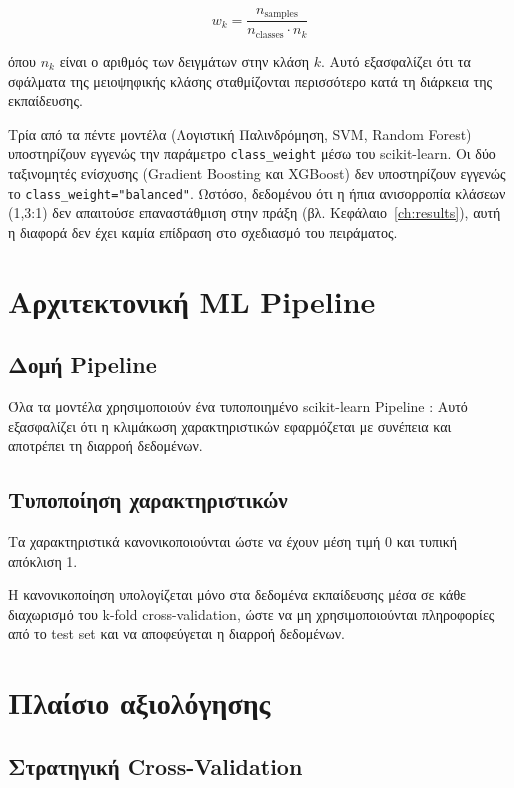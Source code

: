 \begin{equation}
w_k = \frac{n_{\text{samples}}}{n_{\text{classes}} \cdot n_k}
\label{eq:class-weight}
\end{equation}

όπου $n_k$ είναι ο αριθμός των δειγμάτων στην κλάση $k$. Αυτό εξασφαλίζει ότι τα σφάλματα της μειοψηφικής κλάσης σταθμίζονται περισσότερο κατά τη διάρκεια της εκπαίδευσης.

Τρία από τα πέντε μοντέλα (Λογιστική Παλινδρόμηση, SVM, Random Forest) υποστηρίζουν εγγενώς την παράμετρο \texttt{class\_weight} μέσω του scikit-learn. Οι δύο ταξινομητές ενίσχυσης (Gradient Boosting και XGBoost) δεν υποστηρίζουν εγγενώς το \texttt{class\_weight="balanced"}. Ωστόσο, δεδομένου ότι η ήπια ανισορροπία κλάσεων (1,3:1) δεν απαιτούσε επαναστάθμιση στην πράξη (βλ. Κεφάλαιο~\ref{ch:results}), αυτή η διαφορά δεν έχει καμία επίδραση στο σχεδιασμό του πειράματος.

\section{Αρχιτεκτονική ML Pipeline}

\subsection{Δομή Pipeline}

Όλα τα μοντέλα χρησιμοποιούν ένα τυποποιημένο scikit-learn Pipeline \citep{sklearn2011}:
Αυτό εξασφαλίζει ότι η κλιμάκωση χαρακτηριστικών εφαρμόζεται με συνέπεια και αποτρέπει τη διαρροή δεδομένων.

\subsection{Τυποποίηση χαρακτηριστικών}

Τα χαρακτηριστικά κανονικοποιούνται ώστε να έχουν μέση τιμή 0 και τυπική απόκλιση 1.

Η κανονικοποίηση υπολογίζεται μόνο στα δεδομένα εκπαίδευσης μέσα σε κάθε διαχωρισμό του k-fold cross-validation, ώστε να μη χρησιμοποιούνται πληροφορίες από το test set και να αποφεύγεται η διαρροή δεδομένων.

\section{Πλαίσιο αξιολόγησης}

\subsection{Στρατηγική Cross-Validation}
\label{sec:cv-rationale}

